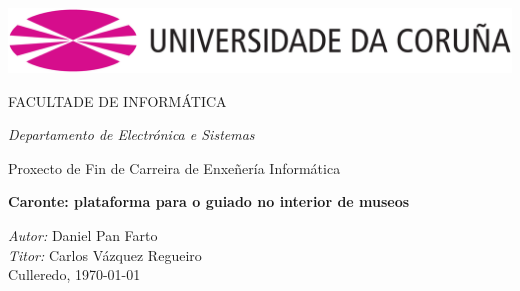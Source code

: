 \begin{titlepage}
\begin{center}

\includegraphics[scale=0.4]{figures/udc}


\Large{FACULTADE DE INFORMÁTICA}

\emph{\large{Departamento de Electrónica e Sistemas}}

Proxecto de Fin de Carreira de Enxeñería Informática

\vspace*{3cm}

\textbf{\LARGE{Caronte: plataforma para o guiado no interior de museos}}

\end{center}

\vspace*{4cm}

\begin{flushright}
\large{
\emph{Autor:} Daniel Pan Farto\\
\emph{Titor: } Carlos Vázquez Regueiro\\
Culleredo, \today}
\end{flushright}

\end{titlepage}
